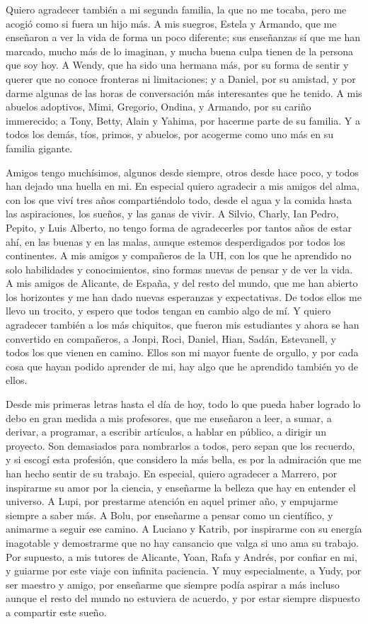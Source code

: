Quiero agradecer también a mi segunda familia, la que no me tocaba, pero me acogió como si fuera un hijo más.
A mis suegros, Estela y Armando, que me enseñaron a ver la vida de forma un poco diferente; sus enseñanzas sí que me han marcado, mucho más de lo imaginan, y mucha buena culpa tienen de la persona que soy hoy.
A Wendy, que ha sido una hermana más, por su forma de sentir y querer que no conoce fronteras ni limitaciones; y a Daniel, por su amistad, y por darme algunas de las horas de conversación más interesantes que he tenido.
A mis abuelos adoptivos, Mimi, Gregorio, Ondina, y Armando, por su cariño immerecido; a Tony, Betty, Alain y Yahima, por hacerme parte de su familia.
Y a todos los demás, tíos, primos, y abuelos, por acogerme como uno más en su familia gigante.

Amigos tengo muchísimos, algunos desde siempre, otros desde hace poco, y todos han dejado una huella en mi.
En especial quiero agradecir a mis amigos del alma, con los que viví tres años compartiéndolo todo, desde el agua y la comida hasta las aspiraciones, los sueños, y las ganas de vivir.
A Silvio, Charly, Ian Pedro, Pepito, y Luis Alberto, no tengo forma de agradecerles por tantos años de estar ahí, en las buenas y en las malas, aunque estemos desperdigados por todos los continentes.
A mis amigos y compañeros de la UH, con los que he aprendido no solo habilidades y conocimientos, sino formas nuevas de pensar y de ver la vida.
A mis amigos de Alicante, de España, y del resto del mundo, que me han abierto los horizontes y me han dado nuevas esperanzas y expectativas.
De todos ellos me llevo un trocito, y espero que todos tengan en cambio algo de mí.
Y quiero agradecer también a los más chiquitos, que fueron mis estudiantes y ahora se han convertido en compañeros, a Jonpi, Roci, Daniel, Hian, Sadán, Estevanell, y todos los que vienen en camino.
Ellos son mi mayor fuente de orgullo, y por cada cosa que hayan podido aprender de mi, hay algo que he aprendido también yo de ellos.

Desde mis primeras letras hasta el día de hoy, todo lo que pueda haber logrado lo debo en gran medida a mis profesores, que me enseñaron a leer, a sumar, a derivar, a programar, a escribir artículos, a hablar en público, a dirigir un proyecto.
Son demasiados para nombrarlos a todos, pero sepan que los recuerdo, y si escogí esta profesión, que considero la más bella, es por la admiración que me han hecho sentir de su trabajo.
En especial, quiero agradecer a Marrero, por inspirarme su amor por la ciencia, y enseñarme la belleza que hay en entender el universo.
A Lupi, por prestarme atención en aquel primer año, y empujarme siempre a saber más.
A Bolu, por enseñarme a pensar como un científico, y animarme a seguir ese camino.
A Luciano y Katrib, por inspirarme con su energía inagotable y demostrarme que no hay cansancio que valga si uno ama su trabajo.
Por supuesto, a mis tutores de Alicante, Yoan, Rafa y Andrés, por confiar en mi, y guiarme por este viaje con infinita paciencia.
Y muy especialmente, a Yudy, por ser maestro y amigo, por enseñarme que siempre podía aspirar a más incluso aunque el resto del mundo no estuviera de acuerdo, y por estar siempre dispuesto a compartir este sueño.

